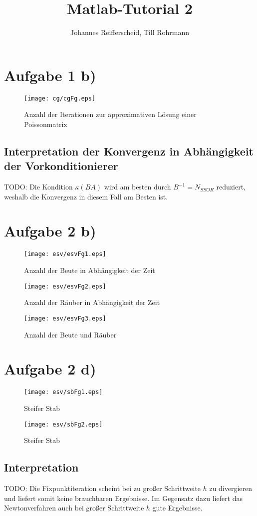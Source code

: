 \documentclass[german]{article}
\author{Johannes Reifferscheid, Till Rohrmann}
\title{
	Matlab-Tutorial 2
}
\begin{document}
	\maketitle
 
   \section*{Aufgabe 1 b)}
   	\begin{figure}[H]
   		\centerline{\texttt{[image: cg/cgFg.eps]}}
   		\caption{Anzahl der Iterationen zur approximativen Lösung einer Poissonmatrix}
   	\end{figure}
   	
   	\subsection*{Interpretation der Konvergenz in Abhängigkeit der Vorkonditionierer}
   		TODO:
   		Die Kondition $\kappa(BA)$ wird am besten durch $B^{-1}=N_{SSOR}$ reduziert, weshalb die Konvergenz in diesem Fall am Besten ist.
   		
   \section*{Aufgabe 2 b)}
   
   	\begin{figure}[H]
			\centerline{\texttt{[image: esv/esvFg1.eps]}}
			\caption{Anzahl der Beute in Abhängigkeit der Zeit}
		\end{figure}
		\begin{figure}[H]
			\centerline{\texttt{[image: esv/esvFg2.eps]}}
			\caption{Anzahl der Räuber in Abhängigkeit der Zeit}
		\end{figure}
		\begin{figure}[H]
			\centerline{\texttt{[image: esv/esvFg3.eps]}}
			\caption{Anzahl der Beute und Räuber}
		\end{figure}
		
	\section*{Aufgabe 2 d)}
		\begin{figure}
		[H]
			\centerline{\texttt{[image: esv/sbFg1.eps]}}
			\caption{Steifer Stab}
		\end{figure}
		\begin{figure}
		[H]
			\centerline{\texttt{[image: esv/sbFg2.eps]}}
			\caption{Steifer Stab}
		\end{figure}
		
		\subsection*{Interpretation}
			TODO:
			Die Fixpunktiteration scheint bei zu großer Schrittweite $h$ zu divergieren und liefert somit keine brauchbaren Ergebnisse.
			Im Gegensatz dazu liefert das Newtonverfahren auch bei großer Schrittweite $h$ gute Ergebnisse.
\end{document}
